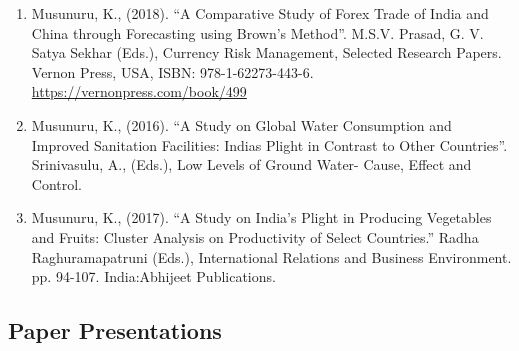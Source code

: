 \documentclass[10pt]{article}
\begin{document}
\begin{enumerate}
\item Musunuru, K., (2018). \enquote{A Comparative Study of Forex Trade of India and China through Forecasting using Brown's Method}. M.S.V. Prasad, G. V. Satya Sekhar (Eds.), Currency Risk Management, Selected Research Papers. Vernon Press, USA, ISBN: 978-1-62273-443-6. \url{https://vernonpress.com/book/499}

\item Musunuru, K., (2016). \enquote{A Study on Global Water Consumption and Improved Sanitation Facilities: Indias Plight in Contrast to Other Countries}. Srinivasulu, A., (Eds.), Low Levels of Ground Water- Cause, Effect and Control. 

\item Musunuru, K., (2017). \enquote{A Study on India's Plight in Producing Vegetables and Fruits: Cluster Analysis on Productivity of Select Countries.} Radha Raghuramapatruni (Eds.), International Relations and Business Environment. pp. 94-107. India:Abhijeet Publications.
\end{enumerate}



\begin{comment} \item \underline{Under Acceptance}:\begin{itemize} 
\item ``Marketing Personnel Spirituality And Its Effects On Work Relationships, Productivity And Conflict Resolution" By Management Insights In SMS-Varanasi.
\item ``Inter Gender Perceptual Differences To OSOS" By Nepalese Academy Of Management In Nepal.
\item ``A Study On Global Water Consumption And Improved Sanitation Facilities: India's Plight In Contrast To Other Countries" By A Conference In Thailand
\item ``The Influence Of Computer Awareness/Knowledge On User Perception Towards Gnu/Linux" By GITAMS Journal, Visakhapatnam.
\item ``Data Mining And Analysis By R Language For Business Research: A Case Study On Stress And Its Influence On Health" By IBS, Hyderabad. \end{itemize} \end{comment} 

\subsection{Paper Presentations} 
\end{document}
